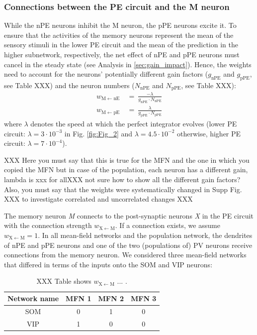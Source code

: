 \documentclass[10pt,a4paper,draft]{article}
\begin{document}
\subsubsection{Connections between the PE circuit and the M neuron}
%
While the nPE neurons inhibit the M neuron, the pPE neurons excite it. To ensure that the activities of the memory neurons represent the mean of the sensory stimuli in the lower PE circuit and the mean of the prediction in the higher subnetwork, respectively, the net effect of nPE and pPE neurons must cancel in the steady state (see Analysis in \ref{sec:gain_impact}). Hence, the weights need to account for the neurons' potentially different gain factors ($g_\mathrm{nPE}$ and $g_\mathrm{pPE}$, see Table XXX) and the neuron numbers ($N_\mathrm{nPE}$ and $N_\mathrm{pPE}$, see Table XXX):
%
\begin{align*}
w_\mathrm{M\leftarrow nE}\  &=\ \frac{-\lambda}{g_\mathrm{nPE} \cdot N_\mathrm{nPE}} \nonumber\\
w_\mathrm{M\leftarrow pE}\  &=\ \frac{\lambda}{g_\mathrm{pPE} \cdot N_\mathrm{pPE}}
\end{align*}
%
where $\lambda$ denotes the speed at which the perfect integrator evolves (lower PE circuit: $\lambda=3\cdot 10^{-3}$  in Fig. \ref{fig:Fig_2} and $\lambda=4.5\cdot 10^{-2}$ otherwise, higher PE circuit:  $\lambda = 7\cdot 10^{-4}$). 

XXX Here you must say that this is true for the MFN and the one in which you copied the MFN but in case of the population, each neuron has a different gain, lambda is xxx for allXXX not sure how to show all the different gain factors? Also, you must say that the weights were systematically changed in Supp Fig. XXX to investigate correlated and uncorrelated changes XXX

The memory neuron \textit{M} connects to the post-synaptic neurons \textit{X} in the PE circuit with the connection strength $w_\mathrm{X\leftarrow M}$. If a connection exists, we assume $w_\mathrm{X\leftarrow M} = 1$. In all mean-field networks and the population network, the dendrites of nPE and pPE neurons and one of the two (populations of) PV neurons receive connections from the memory neuron. We considered three mean-field networks that differed in terms of the inputs onto the SOM and VIP neurons:
%
\begin{table}[h!]
\centering
\begin{tabular}{ |c|c|c|c|  }
\hline
Network name & MFN 1 & MFN 2 & MFN 3  \\
\hline
\hline
SOM & 0 & 1 & 0\\
VIP & 1 & 0 & 0 \\
\hline
\end{tabular}
\caption{XXX Table shows $w_\mathrm{X\leftarrow M}$ ... .}
\label{tab:wXM}
\end{table}
%
\end{document}
